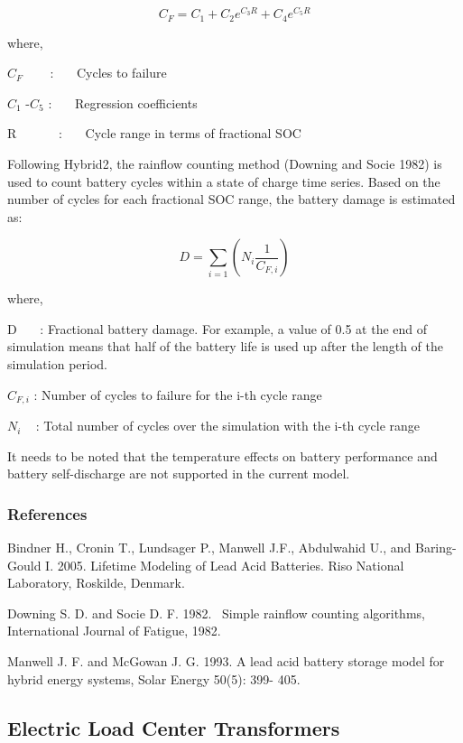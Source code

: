 \begin{equation}
{C_F} = {C_1} + {C_2}{e^{{C_3}R}} + {C_4}{e^{{C_5}R}}
\end{equation}

where,

\({C_F}\) ~~~ :~~~ Cycles to failure

\({C_1}\) -\({C_5}\) :~~~ Regression coefficients

R~~~~~~ :~~~ Cycle range in terms of fractional SOC

Following Hybrid2, the rainflow counting method (Downing and Socie 1982) is used to count battery cycles within a state of charge time series. Based on the number of cycles for each fractional SOC range, the battery damage is estimated as:

\begin{equation}
D = \sum\limits_{i = 1}^{} {\left( {{N_i}\frac{1}{{{C_{F,i}}}}} \right)}
\end{equation}

where,

D~~~ : Fractional battery damage. For example, a value of 0.5 at the end of simulation means that half of the battery life is used up after the length of the simulation period.

\({C_{F,i}}\) : Number of cycles to failure for the i-th cycle range

\({N_i}\) ~ : Total number of cycles over the simulation with the i-th cycle range

It needs to be noted that the temperature effects on battery performance and battery self-discharge are not supported in the current model.

\subsubsection{References}\label{references-021}

Bindner H., Cronin T., Lundsager P., Manwell J.F., Abdulwahid U., and Baring-Gould I. 2005. Lifetime Modeling of Lead Acid Batteries. Riso National Laboratory, Roskilde, Denmark.

Downing S. D. and Socie D. F. 1982.~ Simple rainflow counting algorithms, International Journal of Fatigue, 1982.

Manwell J. F. and McGowan J. G. 1993. A lead acid battery storage model for hybrid energy systems, Solar Energy 50(5): 399- 405.

\subsection{Electric Load Center Transformers}\label{electric-load-center-transformers}

